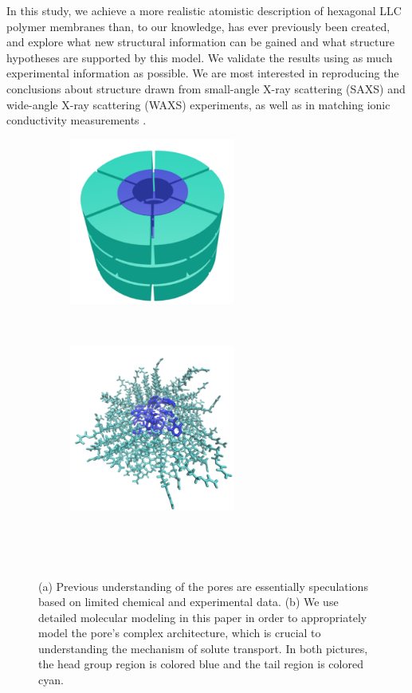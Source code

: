 \documentclass[journal=jpcbfk,manuscript=article]{achemso}
\begin{document}
  In this study, we achieve a more realistic atomistic description of
  hexagonal LLC polymer membranes than, to our knowledge, has ever previously
  been created, and explore what new structural information can be gained and
  what structure hypotheses are supported by this model. We validate the results
  using as much experimental information as possible. We are most interested in
  reproducing the conclusions about structure drawn from small-angle X-ray
  scattering (SAXS) and wide-angle X-ray scattering (WAXS) experiments, as well
  as in matching ionic conductivity measurements \cite{feng_thin_2016}.

  \begin{figure}[!htb]
  \centering
	\begin{subfigure}{0.45\linewidth}
		\centering
		\includegraphics[width=0.6\textwidth]{cartoon_pore.pdf}
		\caption{}~\label{fig:undetailed_pore}
	\end{subfigure}
	\begin{subfigure}{0.45\linewidth}
		\centering
		\includegraphics[width=0.6\textwidth]{detailed_pore.pdf}
		\caption{}~\label{fig:detailed_pore}
	\end{subfigure} 
    \caption{(a) Previous understanding of the pores are essentially speculations 
    based on limited chemical and experimental data. (b) We use detailed molecular 
    modeling in this paper in order to appropriately model the pore's complex architecture,
    which is crucial to understanding the mechanism of solute transport. In both 
    pictures, the head group region is colored blue and the tail region is colored cyan.}~\label{fig:detail}
  \end{figure}
 
\end{document}
